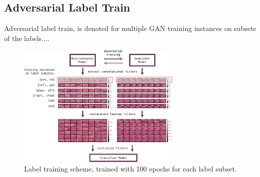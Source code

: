 \subsection{Adversarial Label Train}
Adversarial label train, is denoted for multiple GAN training instances on subsets of the labels....

\begin{figure}[!ht]
  \centering
    \includegraphics[width=0.7\textwidth]{./4_nn/figs/nn_adv_label_scheme}
  \caption{Label training scheme, trained with 100 epochs for each label subset.}
  \label{fig:nn_adv_label_scheme}
\end{figure}
\FloatBarrier
\noindent


